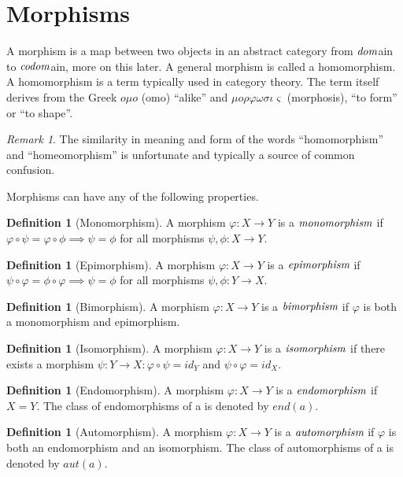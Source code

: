 \documentclass[10pt, oneside, reqno]{amsart}
\theoremstyle{plain}%
\theoremstyle{definition}
\newtheorem{defn}[thm]{Definition}
\theoremstyle{remark}
\newtheorem*{rem}{Remark}
\newcommand{\Id}{\mathit{id}_}
\begin{document}
\section{Morphisms} %
\label{sec:morphisms}
A morphism is a map between two objects in an abstract category from $\emph{dom}$ain to $\emph{codom}$ain, more on this later.
A general morphism is called a homomorphism. A homomorphism is a term typically used in category theory.
The term itself derives from the Greek $o \mu o$ (omo) ``alike'' and $\mu o \rho\varphi\omega\sigma\iota\varsigma$
(morphosis), ``to form'' or ``to shape''.
\begin{rem}
 The similarity in meaning and form of the words ``homomorphism'' and ``homeomorphism'' is unfortunate and typically
 a source of common confusion.
\end{rem}

Morphisms can have any of the following properties.

\begin{defn}[Monomorphism]
 A morphism $\varphi: X \to Y$ is a $\emph{monomorphism}$ if $\varphi \circ \psi = \varphi \circ \phi \implies \psi = \phi$ for all morphisms $\psi,\phi: X \to Y$.
\end{defn}

\begin{defn}[Epimorphism]
 A morphism $\varphi: X \to Y$ is a $\emph{epimorphism}$ if $\psi \circ \varphi = \phi \circ \varphi \implies \psi = \phi$ for all morphisms $\psi,\phi: Y \to X$.
\end{defn}
 
\begin{defn}[Bimorphism]
 A morphism $\varphi: X \to Y$ is a $\emph{bimorphism}$ if $\varphi$ is both a monomorphism and epimorphism.
\end{defn}

\begin{defn}[Isomorphism]
 A morphism $\varphi: X \to Y$ is a $\emph{isomorphism}$ if there exists a morphism $\psi: Y \to X : \varphi \circ \psi = \Id{Y}$ and $\psi \circ \varphi = \Id{X}$.
\end{defn}

\begin{defn}[Endomorphism]
 A morphism $\varphi: X \to Y$ is a $\emph{endomorphism}$ if $X = Y$.
 The class of endomorphisms of a is denoted by $end(a)$.
\end{defn}

\begin{defn}[Automorphism]
 A morphism $\varphi: X \to Y$ is a $\emph{automorphism}$ if $\varphi$ is both an endomorphism and an isomorphism.
 The class of automorphisms of a is denoted by $aut(a)$.
\end{defn}
\end{document}
